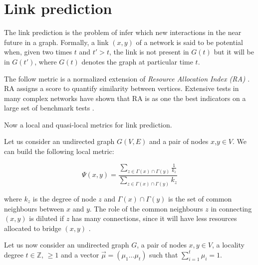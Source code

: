 \section{Link prediction}
\label{sec:link-prediction}

The link prediction is the problem of infer which new interactions in the near future in a graph. Formally, a link $(x,y)$ of a network is said to be potential when, given two times $t$ and $t'>t$, the link is not present in $G(t)$ but it will be in $G(t')$, where $G(t)$ denotes the graph at particular time $t$. 

The follow metric is a normalized extension of \textit{Resource Allocation Index (RA)} \cite{berlusconi2016link, Lu2011,zhou2009predicting}. RA assigns a score to quantify similarity between vertices. Extensive tests in many complex networks have shown that RA is as one the best indicators on a large set of benchmark tests  \cite{berlusconi2016link,Lu2011}.

Now a local and quasi-local metrics for link prediction.

Let us consider an undirected graph $G(V,E)$ and a pair of nodes $x$,$y\in V$. We can build the following local metric:

\begin{equation}
\label{eqn:prediction-local}
\Psi(x,y)=
\frac{\sum\limits_{z\in \Gamma(x) \cap \Gamma(y)}\frac{1}{k_{z}}}
{\sum\limits_{z\in \Gamma(x) \cap \Gamma(y)}k_{z}}
\end{equation}

where $k_{z}$ is the degree of node $z$ and $\Gamma(x) \cap \Gamma(y)$ is the set of common neighbours between $x$ and $y$. The role of the common neighbours $z$ in connecting $(x, y)$ is diluted if $z$ has many connections, since it will have less resources allocated to bridge $(x, y)$ \cite{berlusconi2016link}.

Let us now consider an undirected graph $G$, a pair of nodes $x,y\in V$, a locality degree $t\in \mathbb{Z}$, $\geq 1$ and a vector $\vec{\mu}=(\mu_{1}\ldots\mu_{t})$ such that $\sum_{i=1}^{t}\mu_{i}=1$. 



